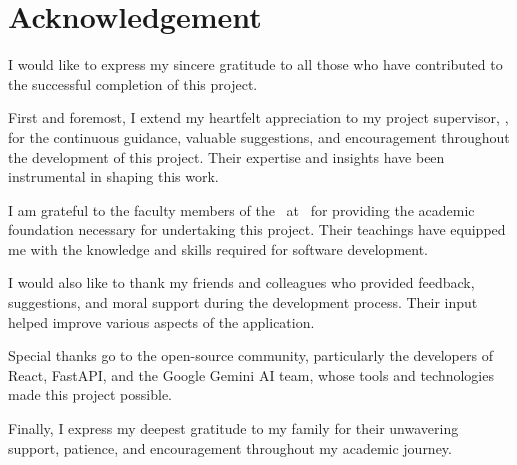 
\chapter*{Acknowledgement}

\vspace{1cm}

I would like to express my sincere gratitude to all those who have contributed to the successful completion of this project.

\vspace{0.5cm}

First and foremost, I extend my heartfelt appreciation to my project supervisor, \textbf{\supervisorname}, for the continuous guidance, valuable suggestions, and encouragement throughout the development of this project. Their expertise and insights have been instrumental in shaping this work.

\vspace{0.5cm}

I am grateful to the faculty members of the \departmentname\ at \collegename\ for providing the academic foundation necessary for undertaking this project. Their teachings have equipped me with the knowledge and skills required for software development.

\vspace{0.5cm}

I would also like to thank my friends and colleagues who provided feedback, suggestions, and moral support during the development process. Their input helped improve various aspects of the application.

\vspace{0.5cm}

Special thanks go to the open-source community, particularly the developers of React, FastAPI, and the Google Gemini AI team, whose tools and technologies made this project possible.

\vspace{0.5cm}

Finally, I express my deepest gratitude to my family for their unwavering support, patience, and encouragement throughout my academic journey.

\vspace{2cm}

\noindent
\studentname

\noindent
\submissiondate
